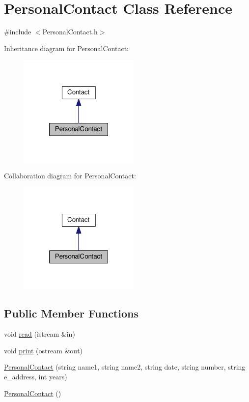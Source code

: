 \hypertarget{classPersonalContact}{}\section{Personal\+Contact Class Reference}
\label{classPersonalContact}


{\ttfamily \#include $<$Personal\+Contact.\+h$>$}



Inheritance diagram for Personal\+Contact\+:
\nopagebreak
\begin{figure}[H]
\begin{center}
\leavevmode
\includegraphics[width=169pt]{classPersonalContact__inherit__graph}
\end{center}
\end{figure}


Collaboration diagram for Personal\+Contact\+:
\nopagebreak
\begin{figure}[H]
\begin{center}
\leavevmode
\includegraphics[width=169pt]{classPersonalContact__coll__graph}
\end{center}
\end{figure}
\subsection*{Public Member Functions}
\begin{DoxyCompactItemize}
\item 
void \hyperlink{classPersonalContact_a10eedd89e14f19b8ad1f7fa938f15747}{read} (istream \&in)
\item 
void \hyperlink{classPersonalContact_a512ff86fb41425bf0c025e9a57715f82}{print} (ostream \&out)
\item 
\hyperlink{classPersonalContact_a381d22b647468294bac27d665ae4ac6c}{Personal\+Contact} (string name1, string name2, string date, string number, string e\+\_\+address, int years)
\item 
\hyperlink{classPersonalContact_aa28ff343ff5e36ce84733bcb6ebf482f}{Personal\+Contact} ()
\end{DoxyCompactItemize}
